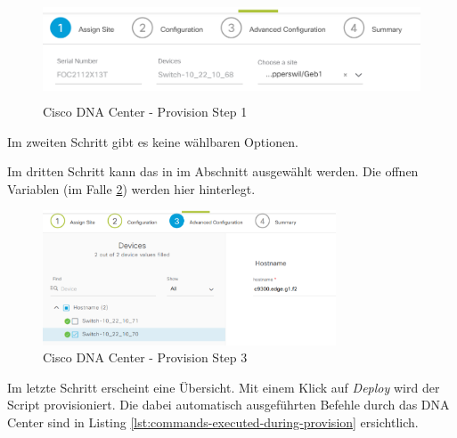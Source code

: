 \begin{figure}[H]
	\centering
	\includegraphics[height=3cm]{img/secondtry/dna-center-provision-step1.png}
	\caption{Cisco DNA Center - Provision Step 1}
	\label{fig:dna-center-provision-step1}
\end{figure}

Im zweiten Schritt gibt es keine wählbaren Optionen. 

Im dritten Schritt kann das in im Abschnitt \cite{Script Template} ausgewählt werden. Die offnen Variablen (im Falle \ref{fig:dna-center-provision-step3}) werden hier hinterlegt. 

\begin{figure}[H]
	\centering
	\includegraphics[height=4cm]{img/secondtry/dna-center-provision-step3.png}
	\caption{Cisco DNA Center - Provision Step 3}
	\label{fig:dna-center-provision-step3}
\end{figure}

Im letzte Schritt erscheint eine Übersicht. Mit einem Klick auf \textit{Deploy} wird der Script provisioniert. Die dabei automatisch ausgeführten Befehle durch das DNA Center sind in Listing \ref{lst:commands-executed-during-provision} ersichtlich.


